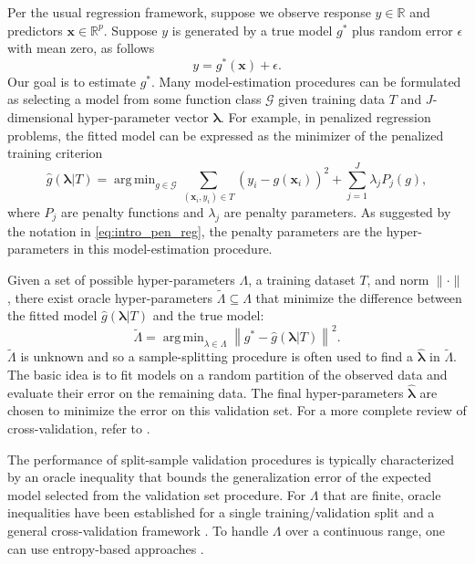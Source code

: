 \documentclass[12pt]{article} %
\theoremstyle{definition}
\DeclareMathOperator*{\argmin}{arg\,min}
\begin{document}
Per the usual regression framework, suppose we observe response $y \in \mathbb{R}$ and predictors $\boldsymbol {x} \in \mathbb{R}^p$. Suppose $y$ is generated by a true model $g^*$ plus random error $\epsilon$ with mean zero, as follows
\begin{equation}
\label{true_model}
y = g^*(\boldsymbol x) + \epsilon.
\end{equation}
Our goal is to estimate $g^*$.
Many model-estimation procedures can be formulated as selecting a model from some function class $\mathcal{G}$ given training data $T$ and $J$-dimensional hyper-parameter vector $\boldsymbol{\lambda}$. For example, in penalized regression problems, the fitted model can be expressed as the minimizer of the penalized training criterion
\begin{equation}
\label{eq:intro_pen_reg}
\hat{g}(\boldsymbol \lambda | T) = \argmin_{g\in \mathcal{G}} \sum_{(\boldsymbol{x}_i, y_i) \in T} \left (y_i -  g(\boldsymbol{x}_i) \right )^2 + \sum_{j=1}^J \lambda_j P_j(g),
\end{equation}
where $P_j$ are penalty functions and $\lambda_j$ are penalty parameters. As suggested by the notation in \eqref{eq:intro_pen_reg}, the penalty parameters are the hyper-parameters in this model-estimation procedure.

Given a set of possible hyper-parameters $\Lambda$, a training dataset $T$, and norm $\|\cdot\|$, there exist oracle hyper-parameters $\tilde{\Lambda} \subseteq \Lambda$ that minimize the difference between the fitted model $\hat{g}\left(\boldsymbol{\lambda|}T\right)$ and the true model:
\[
\tilde{\Lambda} = \argmin_{\lambda \in \Lambda} \left\|g^{*} - \hat{g}\left(\boldsymbol{\lambda|}T\right)\right\|^2.
\]
$\tilde{\Lambda}$ is unknown and so a sample-splitting procedure is often used to find a $\hat{\boldsymbol{\lambda}}$ in $\tilde{\Lambda}$.
The basic idea is to fit models on a random partition of the observed data and evaluate their error on the remaining data.
The final hyper-parameters $\hat{\boldsymbol{\lambda}}$ are chosen to minimize the error on this validation set.
For a more complete review of cross-validation, refer to \citet{arlot2010survey}.

The performance of split-sample validation procedures is typically characterized by an oracle inequality that bounds the generalization error of the expected model selected from the validation set procedure. For $\Lambda$ that are finite, oracle inequalities have been established for a single training/validation split \citep{gyorfi2006distribution} and a general cross-validation framework \citep{van2003unified, van2004asymptotic}. To handle $\Lambda$ over a continuous range, one can use entropy-based approaches \citep{lecue2012oracle}.
\end{document}
